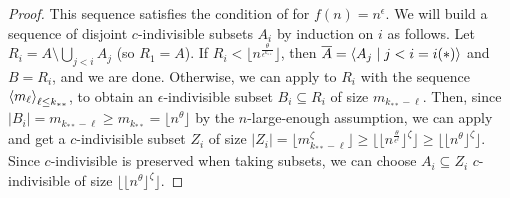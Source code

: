 \begin{theorem}[Theorem 4.23]
\begin{proof}
            This sequence satisfies the condition of  for $f(n) = n^\epsilon$.
            We will build a sequence of disjoint $c$-indivisible subsets $A_i$ by induction on $i$ as follows.
            Let $R_i = A \setminus \bigcup_{j<i} A_j$ (so $R_1 = A$).
            If $R_i < \lfloor n^{\frac{\theta}{\epsilon^{k_{**}}}} \rfloor$, then
            $\overline{A} = \left< A_j \mid j < i = i(*) \right>$ and $B = R_i$, and we are done.
            Otherwise, we can apply  to $R_i$ with the sequence
            $\left< m_\ell \right>_{\ell \leq k_{**}}$, to obtain an $\epsilon$-indivisible subset $B_i \subseteq R_i$ of
            size $m_{k_{**}-\ell}$.
            Then, since $|B_i| = m_{k_{**}-\ell} \geq m_{k_{**}} = \lfloor n^\theta \rfloor$ by the $n$-large-enough assumption,
            we can apply  and get a
            $c$-indivisible subset $Z_i$ of size $|Z_i| = \lfloor m_{k_{**}-\ell}^\zeta \rfloor
            \geq \lfloor \lfloor n^{\frac{\theta}{\epsilon^\ell}} \rfloor ^\zeta \rfloor
            \geq \lfloor \lfloor n^{\theta} \rfloor ^\zeta \rfloor$.
            Since $c$-indivisible is preserved when taking subsets,
            we can choose $A_i \subseteq Z_i$ $c$-indivisible of size $\lfloor \lfloor n^{\theta} \rfloor ^\zeta \rfloor$.
        \end{proof}
    \end{theorem}



